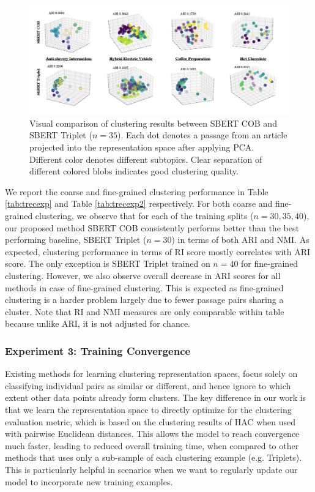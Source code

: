 \documentclass[11pt,a4paper]{article}
\begin{document}
\begin{figure}[h]
    \centering
    \includegraphics[scale=0.45]{acl-ijcnlp2021-templates/compare_cluster_viz.png}
    \caption{Visual comparison of clustering results between SBERT COB and SBERT Triplet ($n=35$). Each dot denotes a passage from an article projected into the representation space after applying PCA. Different color denotes different subtopics. Clear separation of different colored blobs indicates good clustering quality. }
    \label{fig:viz}
\end{figure}

We report the coarse and fine-grained clustering performance in Table \ref{tab:trecexp} and Table \ref{tab:trecexp2} respectively. For both coarse and fine-grained clustering, we observe that for each of the training splits ($n=30,35,40$), our proposed method SBERT COB consistently performs better than the best performing baseline, SBERT Triplet ($n=30$) in terms of both ARI and NMI. As expected, clustering performance in terms of RI score mostly correlates with ARI score. The only exception is SBERT Triplet trained on $n=40$ for fine-grained clustering.  However, we also observe overall decrease in ARI scores for all methods in case of fine-grained clustering. This is expected as fine-grained clustering is a harder problem largely due to fewer passage pairs sharing a cluster. Note that RI and NMI measures are only comparable within table because unlike ARI, it is not adjusted for chance.

\subsubsection{Experiment 3: Training Convergence} 
Existing methods for learning clustering representation spaces, focus solely on classifying individual pairs as similar or different, and hence ignore to which extent other data points already form clusters. The key difference in our work is that we learn the representation space to directly optimize for the clustering evaluation metric, which is based on the clustering results of HAC when used with pairwise Euclidean distances. This allows the model to reach convergence much faster, leading to reduced overall training time, when compared to other methods that uses only a sub-sample of each clustering example (e.g. Triplets). This is particularly helpful in scenarios when we want to regularly update our model to incorporate new training examples.
\end{document}
